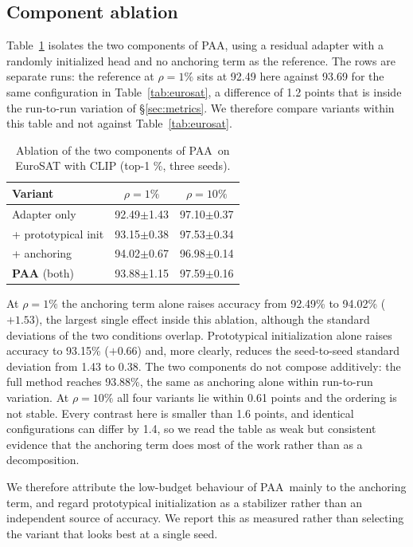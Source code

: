 \documentclass[preprint,12pt]{elsarticle}
\newcommand{\ours}{\textsc{PAA}}
\begin{document}
\subsection{Component ablation}
\label{sec:ablation}

Table~\ref{tab:ablation} isolates the two components of \ours, using a residual
adapter with a randomly initialized head and no anchoring term as the reference.
The rows are separate runs: the reference at $\rho=1\%$ sits at 92.49 here against
93.69 for the same configuration in Table~\ref{tab:eurosat}, a difference of 1.2
points that is inside the run-to-run variation of \S\ref{sec:metrics}. We therefore
compare variants within this table and not against Table~\ref{tab:eurosat}.

\begin{table}[t]
\centering
\caption{Ablation of the two components of \ours\ on EuroSAT with CLIP (top-1
\%, three seeds).}
\label{tab:ablation}
\small
\setlength{\tabcolsep}{6pt}
\begin{tabular}{lcc}
\toprule
Variant & $\rho=1\%$ & $\rho=10\%$ \\
\midrule
Adapter only              & 92.49$\pm$1.43 & 97.10$\pm$0.37 \\
\quad + prototypical init & 93.15$\pm$0.38 & 97.53$\pm$0.34 \\
\quad + anchoring         & 94.02$\pm$0.67 & 96.98$\pm$0.14 \\
\textbf{\ours} (both)     & 93.88$\pm$1.15 & 97.59$\pm$0.16 \\
\bottomrule
\end{tabular}
\end{table}

At $\rho=1\%$ the anchoring term alone raises accuracy from 92.49\% to 94.02\%
($+1.53$), the largest single effect inside this ablation, although
the standard deviations of the two conditions overlap. Prototypical
initialization alone raises accuracy to 93.15\% ($+0.66$) and, more clearly,
reduces the seed-to-seed standard deviation from 1.43 to 0.38. The two
components do not compose additively: the full method reaches 93.88\%, the same
as anchoring alone within run-to-run variation. At $\rho=10\%$ all four variants
lie within 0.61 points and the ordering is not stable. Every contrast here is
smaller than 1.6 points, and identical configurations can differ by 1.4, so we
read the table as weak but consistent evidence that the anchoring term does most
of the work rather than as a decomposition.

We therefore attribute the low-budget behaviour of \ours\ mainly to the
anchoring term, and regard prototypical initialization as a stabilizer rather
than an independent source of accuracy. We report this as measured rather than
selecting the variant that looks best at a single seed.
\end{document}
